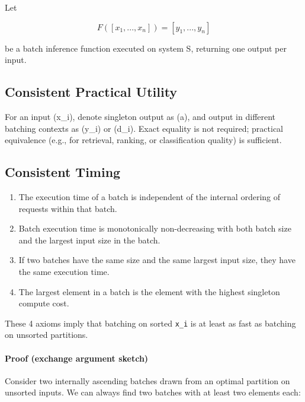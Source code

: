 \documentclass{article}
\providecommand{\tightlist}{\setlength{\itemsep}{0pt}\setlength{\parskip}{0pt}}
\begin{document}
Let

\begin{equation}
F([x_1, ..., x_n]) = [y_1, ..., y_n]
\end{equation}

be a batch inference function executed on system S, returning one output
per input.

\hypertarget{31-consistent-practical-utility}{%
\subsection{Consistent Practical
Utility}\label{31-consistent-practical-utility}}

For an input (x\_i), denote singleton output as (a), and output in
different batching contexts as (y\_i) or (d\_i). Exact equality is not
required; practical equivalence (e.g., for retrieval, ranking, or
classification quality) is sufficient.

\hypertarget{32-consistent-timing}{%
\subsection{Consistent Timing}\label{32-consistent-timing}}

\begin{enumerate}
\def\labelenumi{\arabic{enumi}.}
\tightlist
\item
  The execution time of a batch is independent of the internal ordering
  of requests within that batch.
\item
  Batch execution time is monotonically non-decreasing with both batch
  size and the largest input size in the batch.
\item
  If two batches have the same size and the same largest input size,
  they have the same execution time.
\item
  The largest element in a batch is the element with the highest
  singleton compute cost.
\end{enumerate}

These 4 axioms imply that batching on sorted \texttt{x\_i} is at least
as fast as batching on unsorted partitions.

\hypertarget{33-proof-exchange-argument-sketch}{%
\paragraph{Proof (exchange argument
sketch)}\label{33-proof-exchange-argument-sketch}}

Consider two internally ascending batches drawn from an optimal
partition on unsorted inputs. We can always find two batches with at
least two elements each:
\end{document}
